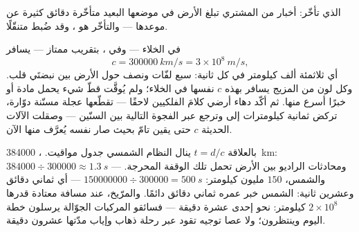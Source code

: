 \begin{omfigure}

{\small {} الذي تأخّر: أخبار  من المشتري تبلغ الأرض
في موضعها البعيد متأخّرة دقائق كثيرة عن موعدها --- والتأخّر
هو ، وقد ضُبط متنقّلًا.}
\end{omfigure}

\begin{proposition}\label{prop:g8:speed-of-light:value}
في الخلاء --- وفي ، بتقريب ممتاز --- يسافر  
\[
c = \qty{300000}{km/s} = 3 \times 10^{8}\ \unit{m/s},
\]
أي ثلاثمئة ألف كيلومتر في كل ثانية: سبع لفّات ونصف حول الأرض
بين نبضتَي قلب. وكل لون من المزيج يسافر بهذه $c$ نفسها في
الخلاء؛ ولم يُوقَّت قطّ شيء يحمل مادة أو خبرًا أسرع منها. ثم
أكّد دهاء أرضي كلامَ الفلكيين لاحقًا ---  تقطّعها عجلة
مسنّنة دوّارة، تركض ثمانية كيلومترات إلى  وترجع عبر الفجوة
التالية بين السنّين --- وصقلت الآلات الحديثة $c$ حتى يقين تامّ
بحيث صار  نفسه يُعرَّف منها الآن.
\end{proposition}

\begin{example}\label{ex:g8:speed-of-light:times}
بالعلاقة $t = d/c$ ينال النظام الشمسي جدول مواقيت. ،
\qty{384000}{km}: $384000 \div 300000 \approx \qty{1.3}{s}$
--- ومحادثات الراديو بين الأرض  تحمل تلك الوقفة
المحرجة. والشمس، $150$ مليون كيلومتر: $150000000 \div 300000 =
\qty{500}{s}$ --- أي ثماني دقائق وعشرين ثانية:  الشمس خبر
عمره ثماني دقائق دائمًا. والمرّيخ، عند مسافة معتادة قدرها
$2 \times 10^{8}$ كيلومتر: نحو إحدى عشرة دقيقة --- فسائقو
المركبات الجوّالة يرسلون خطة اليوم وينتظرون؛ ولا عصا توجيه
تقود عبر رحلة ذهاب وإياب مدّتها عشرون دقيقة.
\end{example}

